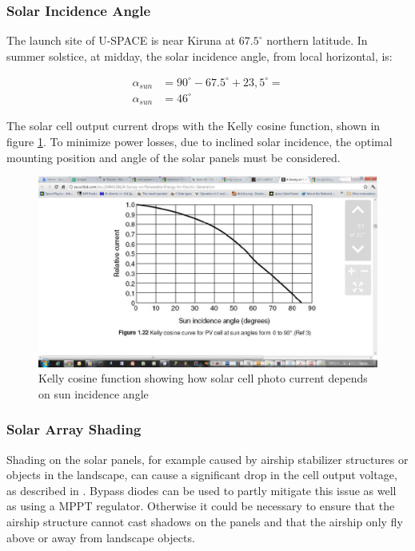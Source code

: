 \subsubsection*{Solar Incidence Angle}
The launch site of U-SPACE is near Kiruna at $67.5^{\circ}$ northern latitude. In summer solstice, at midday, the solar incidence angle, from local horizontal, is:

\begin{equation}
\begin{split}
\alpha _{sun}&=90^{\circ}-67.5^{\circ}+23,5^{\circ} =\\
\alpha _{sun}&=46^{\circ}
\end{split}
\end{equation}

The solar cell output current drops with the Kelly cosine function, shown in figure \ref{fig:KellyCosine}. To minimize power losses, due to inclined solar incidence, the optimal mounting position and angle of the solar panels must be considered.
%
\begin{figure}[H]
\centering
\includegraphics[scale=0.5]{figures/fig_KellyCosine}
\caption{Kelly cosine function showing how solar cell photo current depends on sun incidence angle}
\label{fig:KellyCosine}
\end{figure}
\subsubsection*{Solar Array Shading}
Shading on the solar panels, for example caused by airship stabilizer structures or objects in the landscape, can cause a significant drop in the cell output voltage, as described in \cite[p. 165]{Mukund}. Bypass diodes can be used to partly mitigate this issue as well as using a \ac{MPPT} regulator. Otherwise it could be necessary to ensure that the airship structure cannot cast shadows on the panels and that the airship only fly above or away from landscape objects.
%
%
